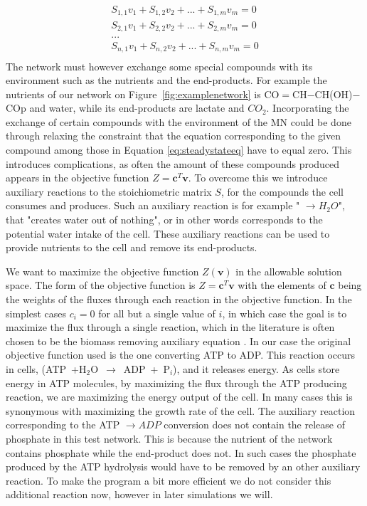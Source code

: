 \documentclass[a4paper,12pt]{article}
\begin{document}
	\begin{equation}\label{eq:steadystateeq}
		\begin{matrix}
			S_{1,1} v_1 + S_{1,2} v_2 + ... + S_{1,m} v_m=0 \\
			S_{2,1} v_1 + S_{2,2} v_2 + ... + S_{2,m} v_m=0 \\
			... \\
			S_{n,1} v_1 + S_{n,2} v_2 + ... + S_{n,m} v_m=0 \\
		\end{matrix}
	\end{equation}
	The network must however exchange some special compounds with its environment such as the nutrients and the end-products. For example the nutrients of our network on Figure~\ref{fig:examplenetwork} is CO$=$CH$-$CH(OH)$-$COp and water, while its end-products are lactate and $CO_2$. Incorporating the exchange of certain compounds with the environment of the MN could be done through relaxing the constraint that the equation corresponding to the given compound among those in Equation \ref{eq:steadystateeq} have to equal zero. This introduces complications, as often the amount of these compounds produced appears in the objective function $Z=\mathbf{c}^T \mathbf{v}$. To overcome this we introduce auxiliary reactions to the stoichiometric matrix $S$, for the compounds the cell consumes and produces. Such an auxiliary reaction is for example " $ \rightarrow H_2O$", that "creates water out of nothing", or in other words corresponds to the potential water intake of the cell. These auxiliary reactions can be used to provide nutrients to the cell and remove its end-products.%


	We want to maximize the objective function $Z \left( \mathbf{v} \right)$ in the allowable solution space.  The form of the objective function is $Z=\mathbf{c}^T \mathbf{v}$ with the elements of $\mathbf{c}$ being the weights of the fluxes through each reaction in the objective function. In the simplest cases $c_i=0$ for all but a single value of $i$, in which case the goal is to maximize the flux through a single reaction, which in the literature is often chosen to be the biomass removing auxiliary equation \cite{whatisfluxbalance}. In our case the original objective function used is the one converting ATP to ADP. This reaction occurs in cells, (ATP~+H$_2$O~$\rightarrow$~ADP~+~P$_i$), and it releases energy. As cells store energy in ATP molecules, by maximizing the flux through the ATP producing reaction, we are maximizing the energy output of the cell. In many cases this is synonymous with maximizing the growth rate of the cell. The auxiliary reaction corresponding to the ATP $\rightarrow ADP$ conversion does not contain the release of phosphate in this test network. This is because the nutrient of the network contains phosphate while the end-product does not. In such cases the phosphate produced by the ATP hydrolysis would have to be removed by an other auxiliary reaction. To make the program a bit more efficient we do not consider this additional reaction now, however in later simulations we will. 
\end{document}
